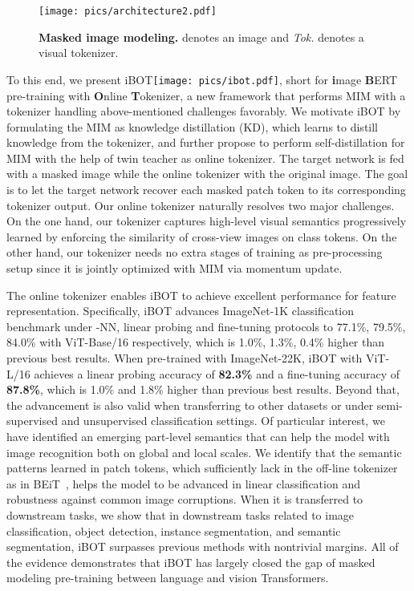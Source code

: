 \documentclass{article} \usepackage{iclr2022_conference,times}
\def\ourmethod{{iBOT}\xspace}
\begin{document}
\begin{wrapfigure}{r}{4cm}
\centering
\vspace{-0.4cm}
\texttt{[image: pics/architecture2.pdf]}
\vspace{-0.6cm}
\caption{\textbf{Masked image modeling.}  denotes an image and \textit{Tok.} denotes a visual tokenizer. }
\vspace{-0.6cm}
\label{fig:tokenizer}
\end{wrapfigure}

To this end, we present \ourmethod \texttt{[image: pics/ibot.pdf]}, short for \textbf{i}mage \textbf{B}ERT pre-training with \textbf{O}nline \textbf{T}okenizer, a new framework that performs MIM with a tokenizer handling above-mentioned challenges favorably.
We motivate \ourmethod by formulating the MIM as knowledge distillation (KD), which learns to distill knowledge from the tokenizer, and further propose to perform self-distillation for MIM with the help of twin teacher as online tokenizer.
The target network is fed with a masked image while the online tokenizer with the original image. 
The goal is to let the target network recover each masked patch token to its corresponding tokenizer output.
Our online tokenizer naturally resolves two major challenges. 
On the one hand, our tokenizer captures high-level visual semantics progressively learned by enforcing the similarity of cross-view images on class tokens. On the other hand, our tokenizer needs no extra stages of training as pre-processing setup since it is jointly optimized with MIM via momentum update.



The online tokenizer enables \ourmethod to achieve excellent performance for feature representation. Specifically, \ourmethod advances ImageNet-1K classification benchmark under -NN, linear probing and fine-tuning protocols to 77.1\%, 79.5\%, 84.0\% with ViT-Base/16 respectively, which is 1.0\%, 1.3\%, 0.4\% higher than previous best results. 
When pre-trained with ImageNet-22K, \ourmethod with ViT-L/16 achieves a linear probing accuracy of \textbf{82.3\%} and a fine-tuning accuracy of \textbf{87.8\%}, which is 1.0\% and 1.8\% higher than previous best results.
Beyond that, the advancement is also valid when transferring to other datasets or under semi-supervised and unsupervised classification settings. 
Of particular interest, we have identified an emerging part-level semantics that can help the model with image recognition both on global and local scales.
We identify that the semantic patterns learned in patch tokens, which sufficiently lack in the off-line tokenizer as in BEiT~\citep{beit}, helps the model to be advanced in linear classification and robustness against common image corruptions.
When it is transferred to downstream tasks, we show that in downstream tasks related to image classification, object detection, instance segmentation, and semantic segmentation, \ourmethod surpasses previous methods with nontrivial margins.
All of the evidence demonstrates that \ourmethod has largely closed the gap of masked modeling pre-training between language and vision Transformers.
\end{document}

